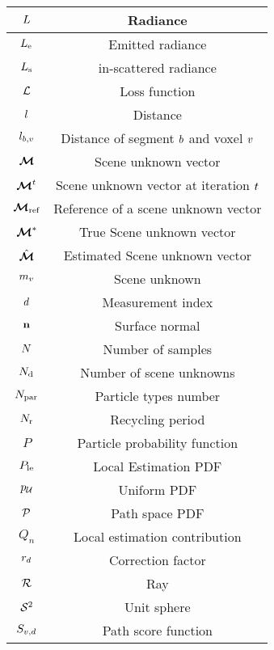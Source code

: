 \begin{center}
\begin{longtable}[c]{|c|c|}
$L$ & Radiance \\ \hline
$L_{\text{e}}$ & Emitted radiance \\ \hline
$L_{\text{s}}$ & in-scattered radiance \\ \hline
$\mathcal{L}$ & Loss function \\ \hline
$l$ & Distance \\ \hline
$l_{b,v}$ & Distance of segment $b$ and voxel $v$\\ \hline

$\boldsymbol{\mathcal{M}}$ & Scene unknown vector\\ \hline
$\boldsymbol{\mathcal{M}}^{t}$ & Scene unknown vector at iteration $t$\\ \hline
$\boldsymbol{\mathcal{M}}_{\text{ref}}$ & Reference of a scene unknown vector \\ \hline
$\boldsymbol{\mathcal{M}}^*$ & True Scene unknown vector\\ \hline
$\Hat{\boldsymbol{\mathcal{M}}}$ & Estimated Scene unknown vector\\ \hline
$m_{v}$ & Scene unknown \\ \hline


$d$ & Measurement index \\ \hline
$\textbf{n}$ & Surface normal \\ \hline
$N$ & Number of samples\\ \hline
$N_{\text{d}}$ & Number of scene unknowns \\ \hline
$N_{\text{par}}$ & Particle types number\\ \hline
$N_{\text{r}}$ & Recycling period\\ \hline


$P$ & Particle probability function \\ \hline
$P_\text{le}$ & Local Estimation \ac{PDF} \\ \hline
$p_{\mathcal{U}}$ & Uniform \ac{PDF} \\ \hline
$\mathcal{P}$ & Path space \ac{PDF} \\ \hline

$Q_n$ & Local estimation contribution \\ \hline
$r_{d}$ & Correction factor \\ \hline
$\mathcal{R}$ & Ray \\ \hline

$\mathcal{S}^2$ & Unit sphere \\ \hline
$S_{v,d}$ & Path score function \\ \hline



\end{longtable}
\end{center}
